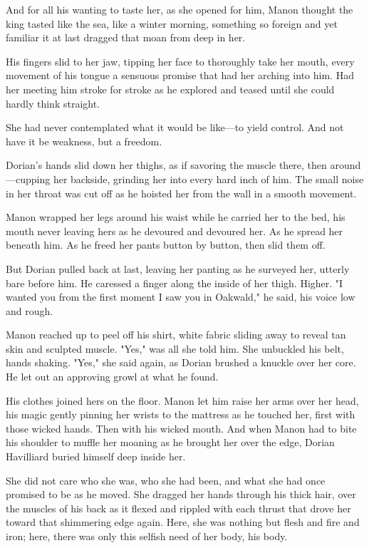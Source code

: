 And for all his wanting to taste her, as she opened for him, Manon thought the king tasted like the sea, like a winter morning, something so foreign and yet familiar it at last dragged that moan from deep in her.

His fingers slid to her jaw, tipping her face to thoroughly take her mouth, every movement of his tongue a sensuous promise that had her arching into him.
Had her meeting him stroke for stroke as he explored and teased until she could hardly think straight.

She had never contemplated what it would be like---to yield control.
And not have it be weakness, but a freedom.

Dorian's hands slid down her thighs, as if savoring the muscle there, then around---cupping her backside, grinding her into every hard inch of him.
The small noise in her throat was cut off as he hoisted her from the wall in a smooth movement.

Manon wrapped her legs around his waist while he carried her to the bed, his mouth never leaving hers as he devoured and devoured her.
As he spread her beneath him.
As he freed her pants button by button, then slid them off.

But Dorian pulled back at last, leaving her panting as he surveyed her, utterly bare before him.
He caressed a finger along the inside of her thigh.
Higher.
"I wanted you from the first moment I saw you in Oakwald," he said, his voice low and rough.

Manon reached up to peel off his shirt, white fabric sliding away to reveal tan skin and sculpted muscle.
"Yes," was all she told him.
She unbuckled his belt, hands shaking.
"Yes," she said again, as Dorian brushed a knuckle over her core.
He let out an approving growl at what he found.

His clothes joined hers on the floor.
Manon let him raise her arms over her head, his magic gently pinning her wrists to the mattress as he touched her, first with those wicked hands.
Then with his wicked mouth.
And when Manon had to bite his shoulder to muffle her moaning as he brought her over the edge, Dorian Havilliard buried himself deep inside her.

She did not care who she was, who she had been, and what she had once promised to be as he moved.
She dragged her hands through his thick hair, over the muscles of his back as it flexed and rippled with each thrust that drove her toward that shimmering edge again.
Here, she was nothing but flesh and fire and iron; here, there was only this selfish need of her body, his body.

